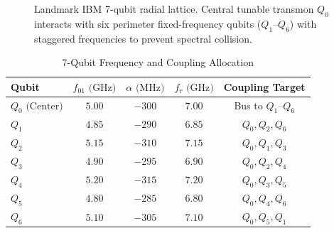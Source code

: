 \documentclass[10pt,journal,compsoc]{IEEEtran}
\begin{document}
\begin{figure}[!t]
\centering
{}
\caption{Landmark IBM 7-qubit radial lattice. Central tunable transmon $Q_0$ interacts with six perimeter fixed-frequency qubits ($Q_1$--$Q_6$) with staggered frequencies to prevent spectral collision.}
\label{fig:lattice}
\end{figure}

\begin{table}[!h]
\centering
\caption{7-Qubit Frequency and Coupling Allocation}
\label{tab:allocation}
\begin{tabular}{lcccc}
\toprule
\textbf{Qubit} & $f_{01}\text{ (GHz)}$ & $\alpha\text{ (MHz)}$ & $f_r\text{ (GHz)}$ & Coupling Target \\
\midrule
$Q_0\text{ (Center)}$ & $5.00$ & $-300$ & $7.00$ & Bus to $Q_1$--$Q_6$ \\
$Q_1$ & $4.85$ & $-290$ & $6.85$ & $Q_0, Q_2, Q_6$ \\
$Q_2$ & $5.15$ & $-310$ & $7.15$ & $Q_0, Q_1, Q_3$ \\
$Q_3$ & $4.90$ & $-295$ & $6.90$ & $Q_0, Q_2, Q_4$ \\
$Q_4$ & $5.20$ & $-315$ & $7.20$ & $Q_0, Q_3, Q_5$ \\
$Q_5$ & $4.80$ & $-285$ & $6.80$ & $Q_0, Q_4, Q_6$ \\
$Q_6$ & $5.10$ & $-305$ & $7.10$ & $Q_0, Q_5, Q_1$ \\
\bottomrule
\end{tabular}
\end{table}
\end{document}
